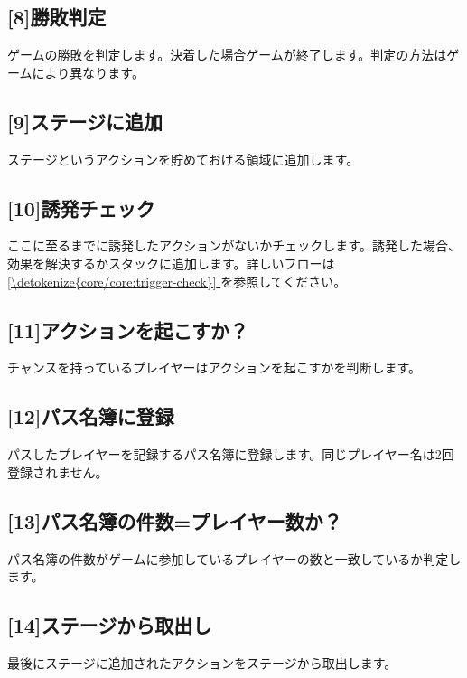 \documentclass[letterpaper,10pt,dvipdfmx]{sphinxmanual}
\begin{document}
\subsection{{[}8{]}勝敗判定}
\label{\detokenize{core/core:winlose}}\label{\detokenize{core/core:id21}}
\sphinxAtStartPar
ゲームの勝敗を判定します。決着した場合ゲームが終了します。判定の方法はゲームにより異なります。


\subsection{{[}9{]}ステージに追加}
\label{\detokenize{core/core:id22}}
\sphinxAtStartPar
ステージというアクションを貯めておける領域に追加します。


\subsection{{[}10{]}誘発チェック}
\label{\detokenize{core/core:id23}}
\sphinxAtStartPar
ここに至るまでに誘発したアクションがないかチェックします。誘発した場合、効果を解決するかスタックに追加します。詳しいフローは \hyperref[\detokenize{core/core:trigger-check}]{\ref{\detokenize{core/core:trigger-check}} } を参照してください。


\subsection{{[}11{]}アクションを起こすか？}
\label{\detokenize{core/core:id24}}
\sphinxAtStartPar
チャンスを持っているプレイヤーはアクションを起こすかを判断します。


\subsection{{[}12{]}パス名簿に登録}
\label{\detokenize{core/core:id25}}
\sphinxAtStartPar
パスしたプレイヤーを記録するパス名簿に登録します。同じプレイヤー名は2回登録されません。


\subsection{{[}13{]}パス名簿の件数=プレイヤー数か？}
\label{\detokenize{core/core:id26}}
\sphinxAtStartPar
パス名簿の件数がゲームに参加しているプレイヤーの数と一致しているか判定します。


\subsection{{[}14{]}ステージから取出し}
\label{\detokenize{core/core:id27}}
\sphinxAtStartPar
最後にステージに追加されたアクションをステージから取出します。
\end{document}
